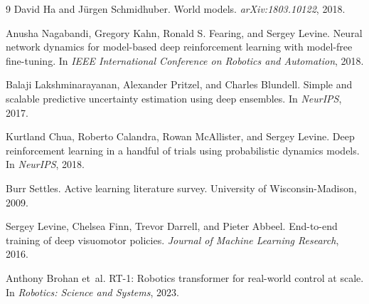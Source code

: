 \documentclass{article}
\begin{document}
\begin{thebibliography}{9}
David Ha and J\"urgen Schmidhuber.
\newblock World models.
\newblock \emph{arXiv:1803.10122}, 2018.

Anusha Nagabandi, Gregory Kahn, Ronald S. Fearing, and Sergey Levine.
\newblock Neural network dynamics for model-based deep reinforcement learning with model-free fine-tuning.
\newblock In \emph{IEEE International Conference on Robotics and Automation}, 2018.

Balaji Lakshminarayanan, Alexander Pritzel, and Charles Blundell.
\newblock Simple and scalable predictive uncertainty estimation using deep ensembles.
\newblock In \emph{NeurIPS}, 2017.

Kurtland Chua, Roberto Calandra, Rowan McAllister, and Sergey Levine.
\newblock Deep reinforcement learning in a handful of trials using probabilistic dynamics models.
\newblock In \emph{NeurIPS}, 2018.

Burr Settles.
\newblock Active learning literature survey.
\newblock University of Wisconsin-Madison, 2009.

Sergey Levine, Chelsea Finn, Trevor Darrell, and Pieter Abbeel.
\newblock End-to-end training of deep visuomotor policies.
\newblock \emph{Journal of Machine Learning Research}, 2016.

Anthony Brohan et~al.
\newblock RT-1: Robotics transformer for real-world control at scale.
\newblock In \emph{Robotics: Science and Systems}, 2023.
\end{thebibliography}
\end{document}
